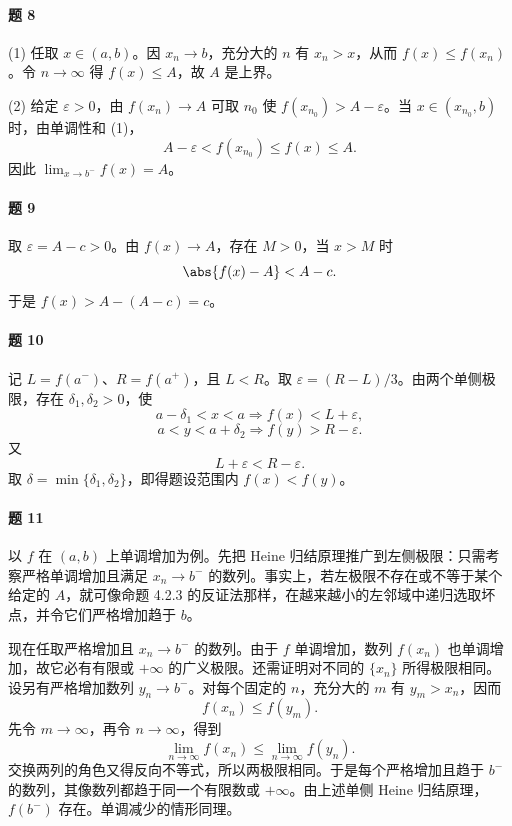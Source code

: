 \paragraph{题 8}
\begin{xsolution}
(1) 任取 $x\in(a,b)$。因 $x_n\to b$，充分大的 $n$ 有 $x_n>x$，从而
$f(x)\leq f(x_n)$。令 $n\to\infty$ 得 $f(x)\leq A$，故 $A$ 是上界。

(2) 给定 $\varepsilon>0$，由 $f(x_n)\to A$ 可取 $n_0$ 使
$f(x_{n_0})>A-\varepsilon$。当 $x\in(x_{n_0},b)$ 时，由单调性和 (1)，
\[
  A-\varepsilon<f(x_{n_0})\leq f(x)\leq A.
\]
因此 $\lim_{x\to b^-}f(x)=A$。
\end{xsolution}

\paragraph{题 9}
\begin{xsolution}
取 $\varepsilon=A-c>0$。由 $f(x)\to A$，存在 $M>0$，当 $x>M$ 时
\[
  \abs{f(x)-A}<A-c.
\]
于是 $f(x)>A-(A-c)=c$。
\end{xsolution}

\paragraph{题 10}
\begin{xsolution}
记 $L=f(a^-)$、$R=f(a^+)$，且 $L<R$。取
$\varepsilon=(R-L)/3$。由两个单侧极限，存在 $\delta_1,\delta_2>0$，使
\[
  a-\delta_1<x<a\Rightarrow f(x)<L+\varepsilon,
\]
\[
  a<y<a+\delta_2\Rightarrow f(y)>R-\varepsilon.
\]
又
\[
  L+\varepsilon<R-\varepsilon.
\]
取 $\delta=\min\{\delta_1,\delta_2\}$，即得题设范围内 $f(x)<f(y)$。
\end{xsolution}

\paragraph{题 11}
\begin{xsolution}
以 $f$ 在 $(a,b)$ 上单调增加为例。先把 Heine 归结原理推广到左侧极限：只需考察严格单调增加且满足 $x_n\to b^-$ 的数列。事实上，若左极限不存在或不等于某个给定的 $A$，就可像命题 4.2.3 的反证法那样，在越来越小的左邻域中递归选取坏点，并令它们严格增加趋于 $b$。

现在任取严格增加且 $x_n\to b^-$ 的数列。由于 $f$ 单调增加，数列 $f(x_n)$ 也单调增加，故它必有有限或 $+\infty$ 的广义极限。还需证明对不同的 $\{x_n\}$ 所得极限相同。设另有严格增加数列 $y_n\to b^-$。对每个固定的 $n$，充分大的 $m$ 有 $y_m>x_n$，因而
\[
  f(x_n)\leq f(y_m).
\]
先令 $m\to\infty$，再令 $n\to\infty$，得到
\[
  \lim_{n\to\infty}f(x_n)\leq\lim_{n\to\infty}f(y_n).
\]
交换两列的角色又得反向不等式，所以两极限相同。于是每个严格增加且趋于 $b^-$ 的数列，其像数列都趋于同一个有限数或 $+\infty$。由上述单侧 Heine 归结原理，$f(b^-)$ 存在。单调减少的情形同理。
\end{xsolution}


